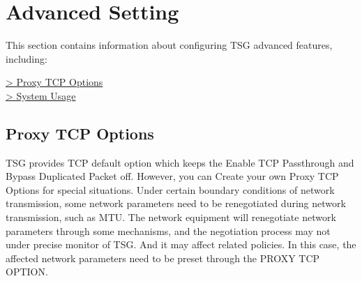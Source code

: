 %
\chapter*{\hypertarget{link:Advanced Setting}{Advanced Setting}}
\label{sec:setting}

This section contains information about configuring TSG advanced features, including:

{
\color{linkblue}
\hyperlink{link:Proxy TCP Options}{> Proxy TCP Options} \\
\hyperlink{link:System Usage }{> System Usage } \\
}
\clearpage

\section*{\hypertarget{link:Proxy TCP Options}{Proxy TCP Options}}
\label{sec:setting:tcp}

TSG provides TCP default option which keeps the Enable TCP Passthrough and Bypass Duplicated Packet off. However, you can Create your own Proxy TCP Options for special situations. Under certain boundary conditions of network transmission, some network parameters need to be renegotiated during network transmission, such as MTU. The network equipment will renegotiate network parameters through some mechanisms, and the negotiation process may not under precise monitor of TSG. And it may affect related policies. In this case, the affected network parameters need to be preset through the PROXY TCP OPTION.

